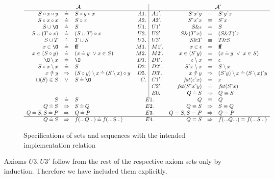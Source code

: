\begin{figure}[hbt]
\label{'setseq'} \(
\begin{array}{rclr|lrcl}
\multicolumn{3}{c}{\cal A} & & & \multicolumn{3}{c}{\cal A'} \\ \cline{1-8} 
S\ap x\ap y & \Eq & S\ap y\ap x & A1.& A1'.& S\lap x\lap y & \equiv & S\lap y\lap x \\
S\ap x\ap x & \Eq & S\ap x & A2.& A2'. & S\lap x\lap x & \equiv & S\lap x \\ 
S\cup\es & \Eq & S & U1. & U1'. &	S\&\epsilon &\Eq &S\\
S\cup (T\ap x)& \Eq & (S\cup T)\ap x & U2.&U2'.& S\& (T\lap x)& \Eq &(S\& T)\lap x \\
S\cup T & \Eq & T\cup S & U3. & U3'.& S\& T & \equiv & T\& S \\ x\in\es & \Eq & \false & M1.& M1'. & x\in\epsilon & \Eq & \false \\ x\in(S\ap y) & \Eq & (x\Eq y\ \lor x\in S) & M2. & M2'. & x\in(S\lap y) & \Eq 
&
(x\Eq y\ \lor\ x\in S) \\
\es\setminus x&\Eq& \es & D1. & D1'.& \epsilon\setminus x &\Eq& \epsilon\\ S\ap x\setminus x&\Eq& S & D2. & D2'.& S\lap x\setminus x &\Eq& S\setminus x\\
x\Not\Eq y & \then & (S\ap y)\setminus x \Eq (S\setminus x)\ap y & D3. & D3'. 
& x\Not\Eq y & \then & (S\lap y)\setminus x \Eq (S\setminus x)\lap y\\ \ch(S)\in S&\lor& S\Eq\es & C. & C1'.& \fst(\epsilon\lap x) &\Eq& x\\ & & & & C2'. & \fst(S\lap x\lap y)& \Eq & \fst(S\lap x)\\ & & & & E0.& Q\Eq S & \then & Q\equiv S \\ S&\Eq &S &\multicolumn{2}{c}{E1.}& Q& \equiv& Q \\ Q\Eq S&\then &S\Eq Q &\multicolumn{2}{c}{E2.}& Q\equiv S & \then & S\equiv Q \\
Q\Eq S, S\Eq P&\then &Q\Eq P &\multicolumn{2}{c}{E3.}& Q\equiv S,S\equiv P & \then & Q\equiv P \\ \cline{1-8}
Q\Eq S &\then &f(...Q...)\Eq f(...S...) &\multicolumn{2}{c}{E4.}& Q\equiv S & \then & f(...Q...)\equiv f(...S...)
\end{array} \)
\caption{Specifications of sets and sequences with the intended implementation relation}
\label{fig:spec}\label{'spec'}
\end{figure}
Axioms $U3, U3'$ follow from the rest of the respective axiom sets only by induction. Therefore we have included them explicitly. 

